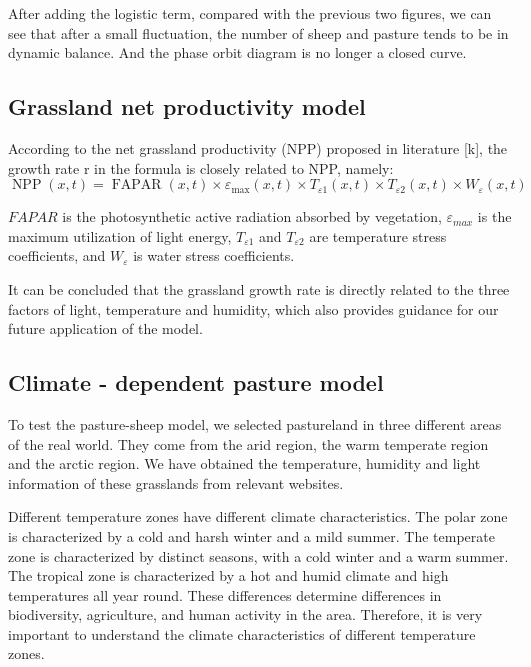 \documentclass[12pt]{article}  %
\newenvironment{shrinkeq}[1]
{ \bgroup
	\addtolength\abovedisplayshortskip{#1}
	\addtolength\abovedisplayskip{#1}
	\addtolength\belowdisplayshortskip{#1}
	\addtolength\belowdisplayskip{#1}}
{\egroup\ignorespacesafterend}
\begin{document}
After adding the logistic term, compared with the previous two figures, we can see that after a small fluctuation, the number of sheep and pasture tends to be in dynamic balance. And the phase orbit diagram is no longer a closed curve.
\newpage
\subsection{Grassland net productivity model}
According to the net grassland productivity (NPP) proposed in literature [k], the growth rate r in the formula is closely related to NPP, namely:
\begin{shrinkeq}{-1ex}
	\begin{equation}
    \label{eq:eq20}
	\operatorname{NPP}(x, t)= \operatorname{FAPAR}(x, t) \times \varepsilon_{\max }(x, t) \times 
	T_{\varepsilon 1}(x, t) \times T_{\varepsilon 2}(x, t) \times W_{\varepsilon}(x, t)
	\end{equation}
\end{shrinkeq}

$FAPAR$ is the photosynthetic active radiation absorbed by vegetation, $\varepsilon_{max}$ is the maximum utilization of light energy, $T_{\varepsilon1}$ and $T_{\varepsilon2}$ are temperature stress coefficients, and $W_{\varepsilon}$ is water stress coefficients.

It can be concluded that the grassland growth rate is directly related to the three factors of light, temperature and humidity, which also provides guidance for our future application of the model.

\subsection{Climate - dependent pasture model}
To test the pasture-sheep model, we selected pastureland in three different areas of the real world. They come from the arid region, the warm temperate region and the arctic region. We have obtained the temperature, humidity and light information of these grasslands from relevant websites.

Different temperature zones have different climate characteristics. The polar zone is characterized by a cold and harsh winter and a mild summer. The temperate zone is characterized by distinct seasons, with a cold winter and a warm summer. The tropical zone is characterized by a hot and humid climate and high temperatures all year round. These differences determine differences in biodiversity, agriculture, and human activity in the area. Therefore, it is very important to understand the climate characteristics of different temperature zones.
\end{document}
